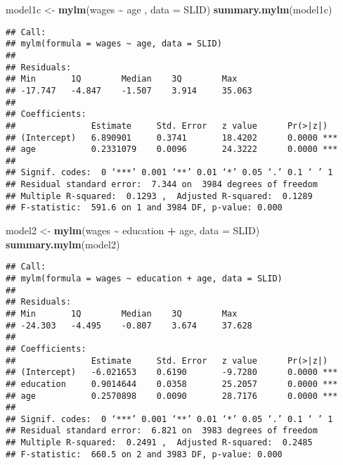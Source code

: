\documentclass[
]{article}
\newenvironment{Shaded}{\begin{snugshade}}{\end{snugshade}}
\newcommand{\AttributeTok}[1]{\textcolor[rgb]{0.13,0.29,0.53}{#1}}
\newcommand{\FunctionTok}[1]{\textcolor[rgb]{0.13,0.29,0.53}{\textbf{#1}}}
\newcommand{\NormalTok}[1]{#1}
\newcommand{\OtherTok}[1]{\textcolor[rgb]{0.56,0.35,0.01}{#1}}
\newcommand{\SpecialCharTok}[1]{\textcolor[rgb]{0.81,0.36,0.00}{\textbf{#1}}}
\begin{document}
\begin{Shaded}
\begin{Highlighting}[]
\NormalTok{model1c }\OtherTok{\textless{}{-}} \FunctionTok{mylm}\NormalTok{(wages }\SpecialCharTok{\textasciitilde{}}\NormalTok{ age , }\AttributeTok{data =}\NormalTok{ SLID)}
\FunctionTok{summary.mylm}\NormalTok{(model1c)}
\end{Highlighting}
\end{Shaded}

\begin{verbatim}
## Call:
## mylm(formula = wages ~ age, data = SLID)
## 
## Residuals:
## Min       1Q        Median    3Q        Max       
## -17.747   -4.847    -1.507    3.914     35.063    
## 
## Coefficients:
##               Estimate     Std. Error   z value      Pr(>|z|)     
## (Intercept)   6.890901     0.3741       18.4202      0.0000 ***   
## age           0.2331079    0.0096       24.3222      0.0000 ***   
## 
## Signif. codes:  0 ‘***’ 0.001 ‘**’ 0.01 ‘*’ 0.05 ‘.’ 0.1 ‘ ’ 1
## Residual standard error:  7.344 on  3984 degrees of freedom 
## Multiple R-squared:  0.1293 ,  Adjusted R-squared:  0.1289 
## F-statistic:  591.6 on 1 and 3984 DF, p-value: 0.000
\end{verbatim}

\begin{Shaded}
\begin{Highlighting}[]
\NormalTok{model2 }\OtherTok{\textless{}{-}} \FunctionTok{mylm}\NormalTok{(wages }\SpecialCharTok{\textasciitilde{}}\NormalTok{ education }\SpecialCharTok{+}\NormalTok{ age, }\AttributeTok{data =}\NormalTok{ SLID)}
\FunctionTok{summary.mylm}\NormalTok{(model2)}
\end{Highlighting}
\end{Shaded}

\begin{verbatim}
## Call:
## mylm(formula = wages ~ education + age, data = SLID)
## 
## Residuals:
## Min       1Q        Median    3Q        Max       
## -24.303   -4.495    -0.807    3.674     37.628    
## 
## Coefficients:
##               Estimate     Std. Error   z value      Pr(>|z|)     
## (Intercept)   -6.021653    0.6190       -9.7280      0.0000 ***   
## education     0.9014644    0.0358       25.2057      0.0000 ***   
## age           0.2570898    0.0090       28.7176      0.0000 ***   
## 
## Signif. codes:  0 ‘***’ 0.001 ‘**’ 0.01 ‘*’ 0.05 ‘.’ 0.1 ‘ ’ 1
## Residual standard error:  6.821 on  3983 degrees of freedom 
## Multiple R-squared:  0.2491 ,  Adjusted R-squared:  0.2485 
## F-statistic:  660.5 on 2 and 3983 DF, p-value: 0.000
\end{verbatim}
\end{document}
